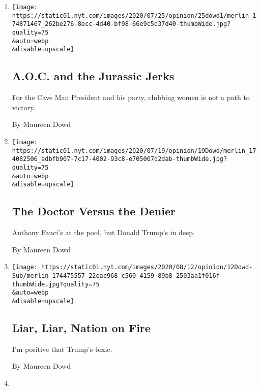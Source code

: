 \begin{enumerate}
\def\labelenumi{\arabic{enumi}.}
\item
  \href{/2020/07/25/opinion/sunday/aoc-yoho-trump-2020.html}{}

  \texttt{[image: https://static01.nyt.com/images/2020/07/25/opinion/25dowd1/merlin\_174871467\_262be276-8ecc-4d40-bf98-66e9c5d37d40-thumbWide.jpg?quality=75\\\&auto=webp\\\&disable=upscale]}

  \hypertarget{aoc-and-the-jurassic-jerks}{%
  \subsection{A.O.C. and the Jurassic
  Jerks}\label{aoc-and-the-jurassic-jerks}}

  For the Cave Man President and his party, clubbing women is not a path
  to victory.

  By Maureen Dowd
\item
  \href{/2020/07/18/opinion/sunday/fauci-trump-coronavirus.html}{}

  \texttt{[image: https://static01.nyt.com/images/2020/07/19/opinion/19Dowd/merlin\_174082506\_adbfb907-7c17-4002-93c8-e705007d2dab-thumbWide.jpg?quality=75\\\&auto=webp\\\&disable=upscale]}

  \hypertarget{the-doctor-versus-the-denier}{%
  \subsection{The Doctor Versus the
  Denier}\label{the-doctor-versus-the-denier}}

  Anthony Fauci's at the pool, but Donald Trump's in deep.

  By Maureen Dowd
\item
  \href{/2020/07/11/opinion/sunday/trump-biden-2020.html}{}

  \texttt{[image: https://static01.nyt.com/images/2020/08/12/opinion/12Dowd-Sub/merlin\_174475557\_22eac968-c560-4159-89b8-2503aa1f016f-thumbWide.jpg?quality=75\\\&auto=webp\\\&disable=upscale]}

  \hypertarget{liar-liar-nation-on-fire}{%
  \subsection{Liar, Liar, Nation on
  Fire}\label{liar-liar-nation-on-fire}}

  I'm positive that Trump's toxic.

  By Maureen Dowd
\item
  \href{/2020/06/27/opinion/sunday/trump-statues-2020-reelection.html}{}


\end{enumerate}

